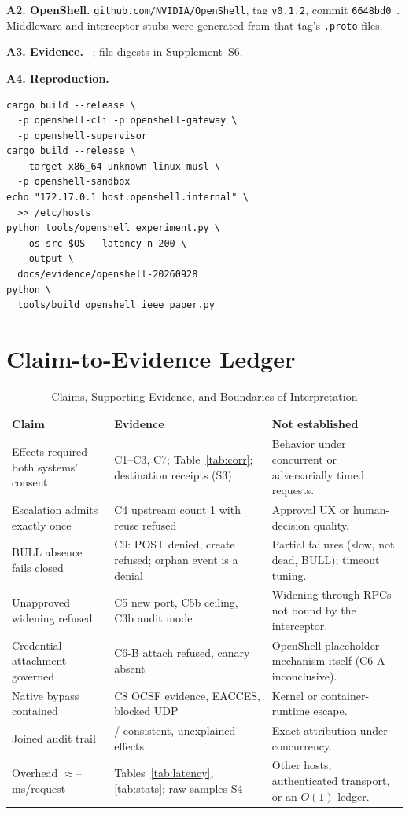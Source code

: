 \documentclass[journal]{IEEEtran}
\newcommand{\bull}{\textsc{BULL}}
\newcommand{\openshell}{OpenShell}
\newcommand{\osshort}{\texttt{6648bd0}}
\begin{document}
\textbf{A2. \openshell{}.} \texttt{github.com/NVIDIA/OpenShell}, tag \texttt{v0.1.2}, commit \osshort{}~\cite{OS_Repo}. Middleware and interceptor stubs were generated from that tag's \texttt{.proto} files.

\textbf{A3. Evidence.} ~\cite{BULL_Evidence}; file digests in Supplement~S6.

\textbf{A4. Reproduction.}
{\footnotesize
\begin{verbatim}
cargo build --release \
  -p openshell-cli -p openshell-gateway \
  -p openshell-supervisor
cargo build --release \
  --target x86_64-unknown-linux-musl \
  -p openshell-sandbox
echo "172.17.0.1 host.openshell.internal" \
  >> /etc/hosts
python tools/openshell_experiment.py \
  --os-src $OS --latency-n 200 \
  --output \
  docs/evidence/openshell-20260928
python \
  tools/build_openshell_ieee_paper.py
\end{verbatim}}

\section{Claim-to-Evidence Ledger}
\begin{table}[!t]
\caption{Claims, Supporting Evidence, and Boundaries of Interpretation}
\label{tab:ledger}
\centering
\small
\begin{tabularx}{\textwidth}{lYY}
\toprule
\textbf{Claim} & \textbf{Evidence} & \textbf{Not established} \\
\midrule
Effects required both systems' consent & C1--C3, C7; Table~\ref{tab:corr}; destination receipts (S3) & Behavior under concurrent or adversarially timed requests. \\
Escalation admits exactly once & C4 upstream count 1 with reuse refused & Approval UX or human-decision quality. \\
\bull{} absence fails closed & C9: POST denied, create refused; orphan event is a denial & Partial failures (slow, not dead, \bull{}); timeout tuning. \\
Unapproved widening refused & C5 new port, C5b ceiling, C3b audit mode & Widening through RPCs not bound by the interceptor. \\
Credential attachment governed & C6-B attach refused, canary absent & \openshell{} placeholder mechanism itself (C6-A inconclusive). \\
Native bypass contained & C8 OCSF evidence, EACCES, blocked UDP & Kernel or container-runtime escape. \\
Joined audit trail & \corrConsistent{}/\corrDecisions{} consistent, \corrUnexplained{} unexplained effects & Exact attribution under concurrency. \\
Overhead $\approx$\deltaGet--\deltaPost\,ms/request & Tables~\ref{tab:latency}, \ref{tab:stats}; raw samples S4 & Other hosts, authenticated transport, or an $O(1)$ ledger. \\
\bottomrule
\end{tabularx}
\end{table}
\end{document}
